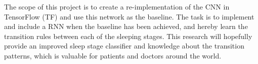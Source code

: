 The scope of this project is to create a re-implementation of the CNN \cite{main_ar} in TensorFlow (TF) and use this network as the baseline.  
The task is to implement and include a RNN when the baseline has been achieved, and hereby learn the transition rules between each of the sleeping stages. 
This research will hopefully provide an improved sleep stage classifier and knowledge about the transition patterns, which is valuable for patients and doctors around the world. 
